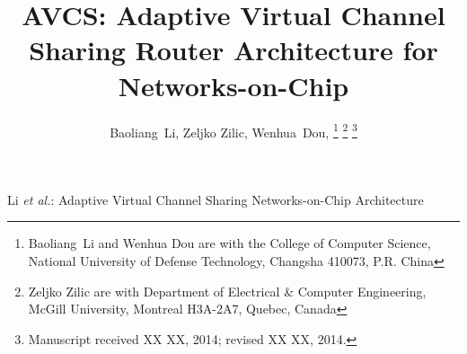 \documentclass[10pt,conference]{IEEEtran}
\begin{document}
\title{AVCS: Adaptive Virtual Channel Sharing Router Architecture for Networks-on-Chip}
\author{Baoliang~Li, %
        Zeljko Zilic, %
        Wenhua~Dou, %
\thanks{Baoliang~Li and Wenhua Dou are with the College of Computer Science, National University of Defense Technology, Changsha 410073, P.R. China}%
\thanks{Zeljko Zilic are with Department of Electrical \& Computer Engineering, McGill University, Montreal H3A-2A7, Quebec, Canada}%
\thanks{Manuscript received XX XX, 2014; revised XX XX, 2014.}}

%
{Li \MakeLowercase{\textit{et al.}}: Adaptive Virtual Channel Sharing Networks-on-Chip Architecture}

\maketitle
\end{document}
